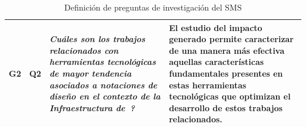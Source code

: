 \begin{table}[H]
\begin{tabular}{|p{0.7cm}|p{1.3cm}|p{5.5cm}|p{6cm}|}
		G2                                                                                                                                                                                                                                                                                                                                               & Q2                &
		\textit{ \textquestiondown Cuáles son los trabajos relacionados con herramientas tecnológicas de mayor tendencia asociados a notaciones de diseño en el contexto de la Infraestructura de~\TI?}                                                                                                                                                                           &
		El estudio del impacto generado permite caracterizar de una manera más efectiva aquellas características fundamentales presentes en estas herramientas tecnológicas que optimizan el desarrollo de estos trabajos relacionados.                                                                                                                                                           \\ \hline
	\end{tabular}
	\caption{Definición de preguntas de investigación del SMS}
	\label{tab:preguntas}
\end{table}

